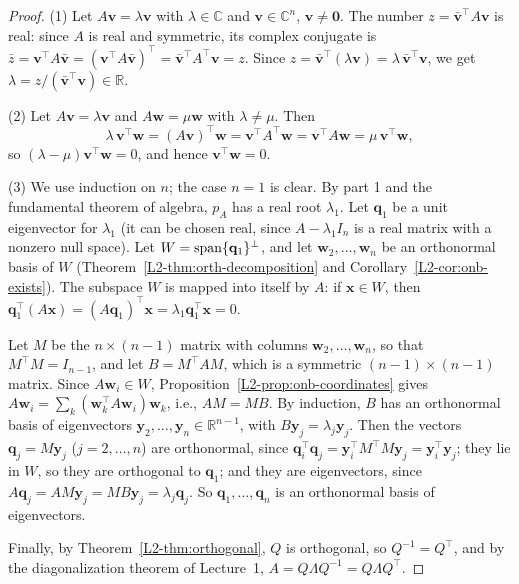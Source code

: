 \begin{proof}
    (1) Let $A\mathbf{v} = \lambda \mathbf{v}$ with $\lambda \in \mathbb{C}$ and $\mathbf{v} \in \mathbb{C}^n$, $\mathbf{v} \neq \mathbf{0}$. The number $z = \bar{\mathbf{v}}^\top A \mathbf{v}$ is real: since $A$ is real and symmetric, its complex conjugate is $\bar{z} = \mathbf{v}^\top A \bar{\mathbf{v}} = (\mathbf{v}^\top A \bar{\mathbf{v}})^\top = \bar{\mathbf{v}}^\top A^\top \mathbf{v} = z$. Since $z = \bar{\mathbf{v}}^\top (\lambda \mathbf{v}) = \lambda\, \bar{\mathbf{v}}^\top \mathbf{v}$, we get $\lambda = z / (\bar{\mathbf{v}}^\top \mathbf{v}) \in \mathbb{R}$.

    (2) Let $A\mathbf{v} = \lambda \mathbf{v}$ and $A\mathbf{w} = \mu \mathbf{w}$ with $\lambda \neq \mu$. Then
    \[\lambda\, \mathbf{v}^\top \mathbf{w} = (A\mathbf{v})^\top \mathbf{w} = \mathbf{v}^\top A^\top \mathbf{w} = \mathbf{v}^\top A \mathbf{w} = \mu\, \mathbf{v}^\top \mathbf{w},\]
    so $(\lambda - \mu) \mathbf{v}^\top \mathbf{w} = 0$, and hence $\mathbf{v}^\top \mathbf{w} = 0$.

    (3) We use induction on $n$; the case $n = 1$ is clear. By part 1 and the fundamental theorem of algebra, $p_A$ has a real root $\lambda_1$. Let $\mathbf{q}_1$ be a unit eigenvector for $\lambda_1$ (it can be chosen real, since $A - \lambda_1 I_n$ is a real matrix with a nonzero null space). Let $W = \operatorname{span}\{\mathbf{q}_1\}^\perp$, and let $\mathbf{w}_2, \ldots, \mathbf{w}_n$ be an orthonormal basis of $W$ (Theorem~\ref{L2-thm:orth-decomposition} and Corollary~\ref{L2-cor:onb-exists}). The subspace $W$ is mapped into itself by $A$: if $\mathbf{x} \in W$, then $\mathbf{q}_1^\top (A\mathbf{x}) = (A\mathbf{q}_1)^\top \mathbf{x} = \lambda_1 \mathbf{q}_1^\top \mathbf{x} = 0$.

    Let $M$ be the $n \times (n-1)$ matrix with columns $\mathbf{w}_2, \ldots, \mathbf{w}_n$, so that $M^\top M = I_{n-1}$, and let $B = M^\top A M$, which is a symmetric $(n-1) \times (n-1)$ matrix. Since $A\mathbf{w}_i \in W$, Proposition~\ref{L2-prop:onb-coordinates} gives $A\mathbf{w}_i = \sum_k (\mathbf{w}_k^\top A \mathbf{w}_i) \mathbf{w}_k$, i.e., $AM = MB$. By induction, $B$ has an orthonormal basis of eigenvectors $\mathbf{y}_2, \ldots, \mathbf{y}_n \in \mathbb{R}^{n-1}$, with $B\mathbf{y}_j = \lambda_j \mathbf{y}_j$. Then the vectors $\mathbf{q}_j = M \mathbf{y}_j$ ($j = 2, \ldots, n$) are orthonormal, since $\mathbf{q}_i^\top \mathbf{q}_j = \mathbf{y}_i^\top M^\top M \mathbf{y}_j = \mathbf{y}_i^\top \mathbf{y}_j$; they lie in $W$, so they are orthogonal to $\mathbf{q}_1$; and they are eigenvectors, since $A\mathbf{q}_j = AM\mathbf{y}_j = MB\mathbf{y}_j = \lambda_j \mathbf{q}_j$. So $\mathbf{q}_1, \ldots, \mathbf{q}_n$ is an orthonormal basis of eigenvectors.

    Finally, by Theorem~\ref{L2-thm:orthogonal}, $Q$ is orthogonal, so $Q^{-1} = Q^\top$, and by the diagonalization theorem of Lecture~1, $A = Q\Lambda Q^{-1} = Q\Lambda Q^\top$.
\end{proof}

